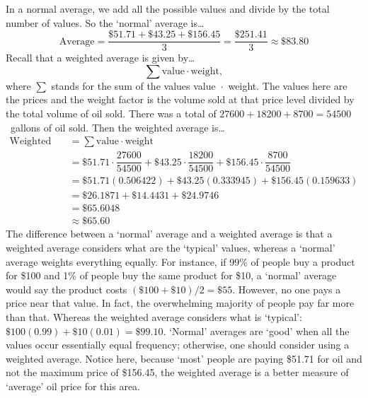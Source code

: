 \documentclass[11pt,letterpaper]{article}
\begin{document}
\sol In a normal average, we add all the possible values and divide by the total number of values. So the `normal' average is\dots 
	\[
	\text{Average}= \dfrac{\$51.71 + \$43.25 + \$156.45}{3}= \dfrac{\$251.41}{3} \approx \$83.80
	\]
Recall that a weighted average is given by\dots 
	\[
	\sum \text{value} \cdot \text{weight},
	\] 
where $\sum$ stands for the sum of the values value~$\cdot$~weight. The values here are the prices and the weight factor is the volume sold at that price level divided by the total volume of oil sold. There was a total of $27600 + 18200 + 8700= 54500$~gallons of oil sold. Then the weighted average is\dots
	\[
	\begin{aligned}
	\text{Weighted Average}&= \sum \text{value} \cdot \text{weight} \\[0.3cm]
	&= \$51.71 \cdot \dfrac{27600}{54500} + \$43.25 \cdot \dfrac{18200}{54500} + \$156.45 \cdot \dfrac{8700}{54500} \\[0.3cm]
	&= \$51.71 (0.506422) + \$43.25 (0.333945) + \$156.45 (0.159633) \\[0.3cm]
	&= \$26.1871 + \$14.4431 + \$24.9746 \\[0.3cm]
	&= \$65.6048 \\[0.3cm]
	&\approx \$65.60
	\end{aligned}
	\]
The difference between a `normal' average and a weighted average is that a weighted average considers what are the `typical' values, whereas a `normal' average weights everything equally. For instance, if 99\% of people buy a product for \$100 and 1\% of people buy the same product for \$10, a `normal' average would say the product costs $(\$100 + \$10)/2= \$55$. However, no one pays a price near that value. In fact, the overwhelming majority of people pay far more than that. Whereas the weighted average considers what is `typical': $\$100(0.99) + \$10(0.01)= \$99.10$. `Normal' averages are `good' when all the values occur essentially equal frequency; otherwise, one should consider using a weighted average. Notice here, because `most' people are paying \$51.71 for oil and not the maximum price of \$156.45, the weighted average is a better measure of `average' oil price for this area. 
\end{document}
